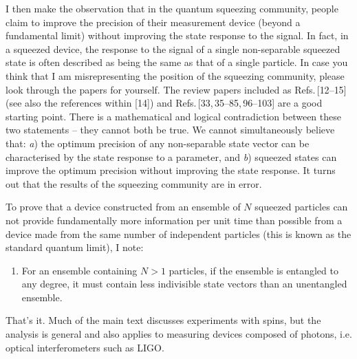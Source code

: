\documentclass[reqno]{amsart}
\begin{document}
I then make the observation that in the quantum squeezing community, people claim to improve the precision of their measurement device (beyond a fundamental limit) without improving the state response to the signal. In fact, in a squeezed device, the response to the signal of a single non-separable squeezed state is often described as being the same as that of a single particle. In case you think that I am misrepresenting the position of the squeezing community, please look through the papers for yourself. The review papers included as Refs.\,[\textcolor{blue!50!black}{12}--\textcolor{blue!50!black}{15}] (see also the references within [\textcolor{blue!50!black}{14}]) and Refs.\,[\textcolor{blue!50!black}{33},\,\textcolor{blue!50!black}{35}--\textcolor{blue!50!black}{85},\,\textcolor{blue!50!black}{96}--\textcolor{blue!50!black}{103}] are a good starting point. There is a mathematical and logical contradiction between these two statements -- they cannot both be true. We cannot simultaneously believe that: \textit{a}) the optimum precision of any non-separable state vector can be characterised by the state response to a parameter, and \textit{b}) squeezed states can improve the optimum precision without improving the state response. It turns out that the results of the squeezing community are in error.

To prove that a device constructed from an ensemble of $N$ squeezed particles can not provide fundamentally more information per unit time than possible from a device made from the same number of independent particles (this is known as the standard quantum limit), I note:
\begin{enumerate}
\item For an ensemble containing $N > 1$ particles, if the ensemble is entangled to any degree, it must contain less indivisible state vectors than an unentangled ensemble.
\end{enumerate}
That's it. Much of the main text discusses experiments with spins, but the analysis is general and also applies to measuring devices composed of photons, i.e. optical interferometers such as LIGO.\\
\end{document}
